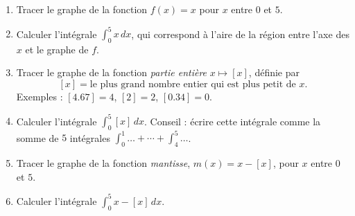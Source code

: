 \begin{exercice}\label{exoExamen-0001}
  \begin{enumerate}
  \item Tracer le graphe de la fonction $f(x)=x$ pour $x$ entre $0$ et $5$.
    \item Calculer l'intégrale $\displaystyle \int_{0}^{5} x\, dx$, qui correspond à l'aire de la région entre l'axe des $x$ et le graphe de $f$.
      \item Tracer le graphe de la fonction \emph{partie entière} $x\mapsto [x]$, définie par 
        \[[x]=\textrm{le plus grand nombre entier qui est plus petit de } x.
        \]
        Exemples : $[4.67]=4$, $[2]=2$, $[0.34]=0$.
        \item Calculer l'intégrale $\displaystyle \int_{0}^{5} [x]\, dx$. Conseil : écrire cette intégrale comme la somme de $5$ intégrales $\int_{0}^{1}\ldots+ \cdots +\int_{4}^{5}\ldots$. 
          \item Tracer le graphe de la fonction \emph{mantisse}, $m(x)=x-[x]$, pour $x$ entre $0$ et $5$.
          \item Calculer l'intégrale $\displaystyle \int_{0}^{5} x-[x]\, dx$.
  \end{enumerate}
\end{exercice}
